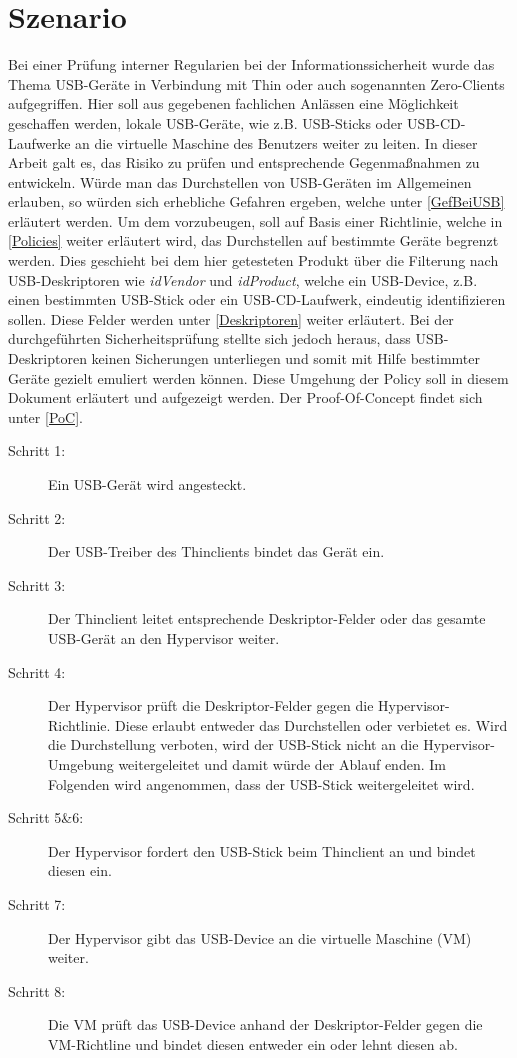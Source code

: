 \chapter{Szenario}
Bei einer Prüfung interner Regularien bei der Informationssicherheit wurde das Thema USB-Geräte in Verbindung mit Thin oder auch sogenannten Zero-Clients aufgegriffen. Hier soll aus gegebenen fachlichen Anlässen eine Möglichkeit geschaffen werden, lokale USB-Geräte, wie z.B. USB-Sticks oder USB-CD-Laufwerke an die virtuelle Maschine des Benutzers weiter zu leiten. In dieser Arbeit galt es, das Risiko zu prüfen und entsprechende Gegenmaßnahmen zu entwickeln.
Würde man das Durchstellen von USB-Geräten im Allgemeinen erlauben, so würden sich erhebliche Gefahren ergeben, welche unter \ref{GefBeiUSB} erläutert werden. Um dem vorzubeugen, soll auf Basis einer Richtlinie, welche in \ref{Policies} weiter erläutert wird, das Durchstellen auf bestimmte Geräte begrenzt werden. Dies geschieht bei dem hier getesteten Produkt über die Filterung nach USB-Deskriptoren wie \textit{idVendor} und \textit{idProduct}, welche ein USB-Device, z.B. einen bestimmten USB-Stick oder ein USB-CD-Laufwerk, eindeutig identifizieren sollen. Diese Felder werden unter \ref{Deskriptoren} weiter erläutert.
Bei der durchgeführten Sicherheitsprüfung stellte sich jedoch heraus, dass USB-Deskriptoren keinen Sicherungen unterliegen und somit mit Hilfe bestimmter Geräte gezielt emuliert werden können. Diese Umgehung der Policy soll in diesem Dokument erläutert und aufgezeigt werden. Der Proof-Of-Concept findet sich unter \ref{PoC}.



\begin{description}
	\item[Schritt 1: ] Ein USB-Gerät wird angesteckt.
	\item[Schritt 2: ] Der USB-Treiber des Thinclients bindet das Gerät ein.
	\item[Schritt 3: ] Der Thinclient leitet entsprechende Deskriptor-Felder oder das gesamte USB-Gerät an den Hypervisor weiter. 
	\item[Schritt 4: ] Der Hypervisor prüft die Deskriptor-Felder gegen die Hypervisor-Richtlinie. Diese erlaubt entweder das Durchstellen oder verbietet es. Wird die Durchstellung verboten, wird der USB-Stick nicht an die Hypervisor-Umgebung weitergeleitet und damit würde der Ablauf enden. Im Folgenden wird angenommen, dass der USB-Stick weitergeleitet wird.
	\item[Schritt 5\&6: ] Der Hypervisor fordert den USB-Stick beim Thinclient an und bindet diesen ein.
	\item[Schritt 7: ] Der Hypervisor gibt das USB-Device an die virtuelle Maschine (VM) weiter.
	\item[Schritt 8: ] Die VM prüft das USB-Device anhand der Deskriptor-Felder gegen die VM-Richtline und bindet diesen entweder ein oder lehnt diesen ab.
\end{description}